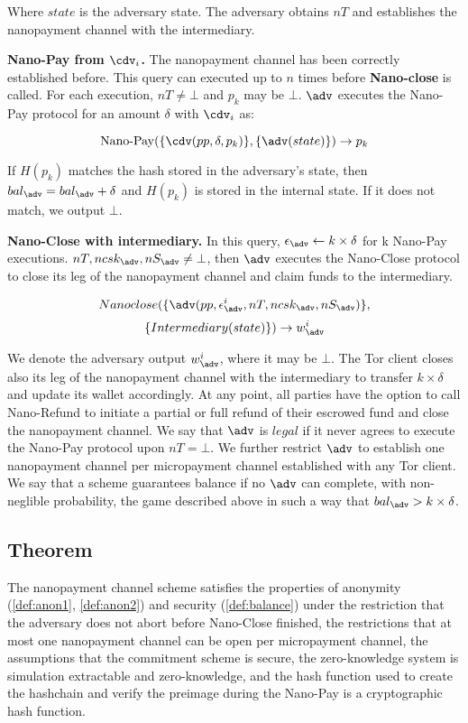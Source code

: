 Where $state$ is the adversary state.
The adversary obtains $nT$ and establishes the nanopayment channel with the intermediary.

\textbf{Nano-Pay from $\cdv_i$.}
The nanopayment channel has been correctly established before.
This query can executed up to $n$ times before \textbf{Nano-close} is called.
For each execution, $nT \neq \bot$ and $p_k$ may be $\bot$.
$\adv$ executes the Nano-Pay protocol for an amount $\delta$ with $\cdv_i$ as:

$$\operatorname{Nano-Pay}(\{\cdv(pp,\delta,p_k)\},\{\adv(state)\}) \rightarrow p_k$$

If $H(p_k)$ matches the hash stored in the adversary's state, then $bal_\adv = bal_\adv+\delta$ and $H(p_k)$ is stored in the internal state.
If it does not match, we output $\bot$.

\textbf{Nano-Close with intermediary.}
In this query, $\epsilon_\adv \leftarrow k \times \delta$ for k Nano-Pay executions.
$nT, ncsk_\adv, nS_\adv \neq \bot$, then $\adv$ executes the Nano-Close protocol to close its leg of the nanopayment channel and claim funds to the intermediary.

$$Nano\-close(\{\adv(pp, \epsilon^i_\adv, nT, ncsk_\adv, nS_\adv)\},$$ $$\{Intermediary(state)\}) \rightarrow w^i_\adv$$

We denote the adversary output $w^i_\adv$, where it may be $\bot$.
The Tor client closes also its leg of the nanopayment channel with the intermediary to transfer $k \times \delta$ and update its wallet accordingly.
At any point, all parties have the option to call Nano-Refund to initiate a partial or full refund of their escrowed fund and close the nanopayment channel.
We say that $\adv$ is $legal$ if it never agrees to execute the Nano-Pay protocol upon $nT = \bot$.
We further restrict $\adv$ to establish one nanopayment channel per micropayment channel established with any Tor client.
We say that a scheme guarantees balance if no $\adv$ can complete, with non-neglible probability, the game described above in such a way that $bal_\adv > k \times \delta$.

\subsection{Theorem}

The nanopayment channel scheme satisfies the properties of anonymity (\ref{def:anon1}, \ref{def:anon2}) and security (\ref{def:balance}) under the restriction that the adversary does not abort before Nano-Close finished, the restrictions that at most one nanopayment channel can be open per micropayment channel, the assumptions that the commitment scheme is secure, the zero-knowledge system is simulation extractable and zero-knowledge, and the hash function used to create the hashchain and verify the preimage during the Nano-Pay is a cryptographic hash function.

